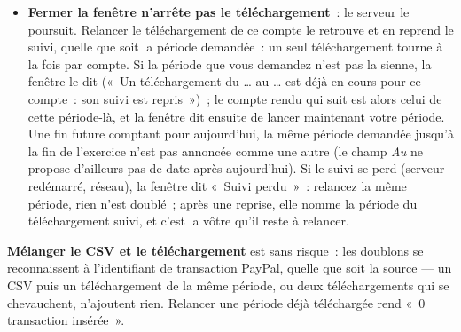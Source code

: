 \documentclass[a4paper,11pt,oneside]{article}
\begin{document}
\begin{itemize}
    \item \textbf{Fermer la fenêtre n'arrête pas le téléchargement}~: le serveur le poursuit. Relancer le téléchargement de ce compte le retrouve et en reprend le suivi, quelle que soit la période demandée~: un seul téléchargement tourne à la fois par compte. Si la période que vous demandez n'est pas la sienne, la fenêtre le dit («~Un téléchargement du \ldots{} au \ldots{} est déjà en cours pour ce compte~: son suivi est repris~»)~; le compte rendu qui suit est alors celui de cette période-là, et la fenêtre dit ensuite de lancer maintenant votre période. Une fin future comptant pour aujourd'hui, la même période demandée jusqu'à la fin de l'exercice n'est pas annoncée comme une autre (le champ \emph{Au} ne propose d'ailleurs pas de date après aujourd'hui). Si le suivi se perd (serveur redémarré, réseau), la fenêtre dit «~Suivi perdu~»~: relancez la même période, rien n'est doublé~; après une reprise, elle nomme la période du téléchargement suivi, et c'est la vôtre qu'il reste à relancer.
\end{itemize}
\textbf{Mélanger le CSV et le téléchargement} est sans risque~: les doublons se reconnaissent à l'identifiant de transaction PayPal, quelle que soit la source --- un CSV puis un téléchargement de la même période, ou deux téléchargements qui se chevauchent, n'ajoutent rien. Relancer une période déjà téléchargée rend «~0 transaction insérée~».
\end{document}
